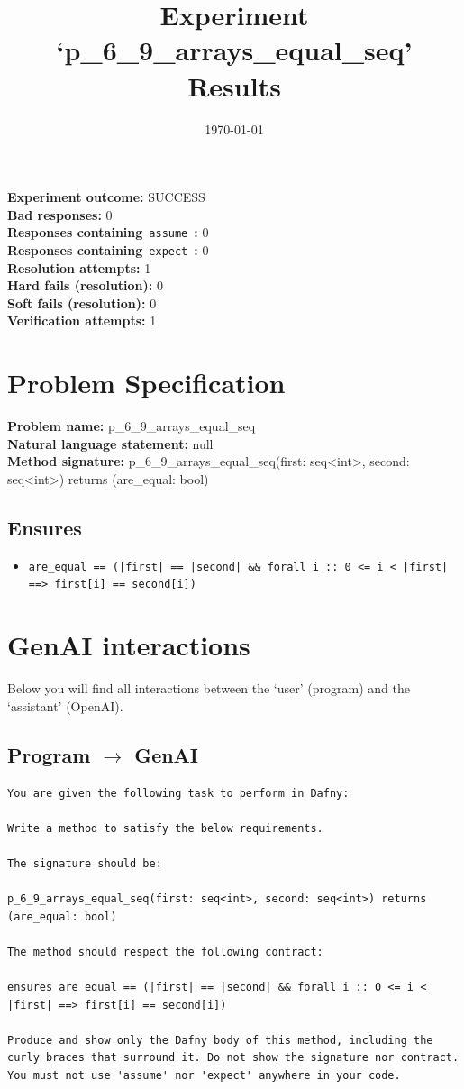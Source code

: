 \documentclass{article}
\begin{document}
\title{Experiment `p\_6\_9\_arrays\_equal\_seq' Results}
\author{\today}
\date{}
\maketitle
\textbf{Experiment outcome: }SUCCESS
\\\textbf{Bad responses: }0
\\\textbf{Responses containing}~\texttt{assume}~\textbf{: }0
\\\textbf{Responses containing}~\texttt{expect}~\textbf{: }0
\\\textbf{Resolution attempts: }1
\\\textbf{Hard fails (resolution): }0
\\\textbf{Soft fails (resolution): }0
\\\textbf{Verification attempts: }1
\section*{Problem Specification}
\textbf{Problem name: }p\_6\_9\_arrays\_equal\_seq
\\\textbf{Natural language statement: }null
\\\textbf{Method signature: }p\_6\_9\_arrays\_equal\_seq(first: seq<int>, second: seq<int>) returns (are\_equal: bool)
\subsection*{Ensures}
\begin{itemize}
\item \texttt{are\_equal == (|first| == |second| \&\& forall i :: 0 <= i < |first| ==> first[i] == second[i])}
\end{itemize}
\clearpage
\section*{GenAI interactions}
Below you will find all interactions between the `user' (program) and the `assistant' (OpenAI).
\subsection*{Program $\rightarrow$ GenAI}
\begin{lstlisting}
You are given the following task to perform in Dafny:

Write a method to satisfy the below requirements.

The signature should be:

p_6_9_arrays_equal_seq(first: seq<int>, second: seq<int>) returns (are_equal: bool)

The method should respect the following contract:

ensures are_equal == (|first| == |second| && forall i :: 0 <= i < |first| ==> first[i] == second[i])

Produce and show only the Dafny body of this method, including the curly braces that surround it. Do not show the signature nor contract. You must not use 'assume' nor 'expect' anywhere in your code.
\end{lstlisting}
\end{document}
